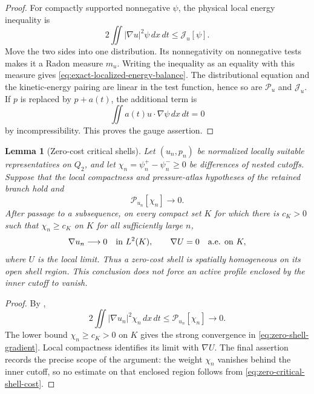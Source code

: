 \documentclass[11pt]{amsart}
\numberwithin{equation}{section}
\theoremstyle{plain}
\newtheorem{lemma}[lemma]{Lemma}
\theoremstyle{definition}
\theoremstyle{remark}
\begin{document}
\begin{proof}
For compactly supported nonnegative \(\psi\), the physical local energy
inequality is
\[
 2\iint|\nabla u|^2\psi\,dx\,dt
 \le \mathscr J_u[\psi].
\]
Move the two sides into one distribution.  Its nonnegativity on nonnegative
tests makes it a Radon measure \(m_u\).  Writing the inequality as an equality
with this measure gives
\eqref{eq:exact-localized-energy-balance}.  The distributional equation and
the kinetic-energy pairing are linear in the test function, hence so are
\(\mathscr P_u\) and \(\mathscr J_u\).  If \(p\) is replaced by
\(p+a(t)\), the additional term is
\[
 \iint a(t)u\cdot\nabla\psi\,dx\,dt=0
\]
by incompressibility.  This proves the gauge assertion.
\end{proof}

\begin{lemma}[Zero-cost critical shells]
\label{lem:critical-shell-zero-cost-limit}
Let \((u_n,p_n)\) be normalized locally suitable representatives on
\(Q_2\), and let \(\chi_n=\psi_n^+-\psi_n^-\ge0\) be differences of nested
cutoffs.  Suppose that the local compactness and pressure-atlas hypotheses of
the retained branch hold and
\begin{equation}\label{eq:zero-critical-shell-cost}
 \mathscr P_{u_n}[\chi_n]\longrightarrow0.
\end{equation}
After passage to a subsequence, on every compact set \(K\) for which there is
\(c_K>0\) such that \(\chi_n\ge c_K\) on \(K\) for all sufficiently large
\(n\),
\begin{equation}\label{eq:zero-shell-gradient}
 \nabla u_n\longrightarrow0\quad\hbox{in }L^2(K),
 \qquad \nabla U=0\quad\hbox{a.e. on }K,
\end{equation}
where \(U\) is the local limit.  Thus a zero-cost shell is spatially
homogeneous on its open shell region.  This conclusion does not force an
active profile enclosed by the inner cutoff to vanish.
\end{lemma}

\begin{proof}
By ,
\[
 2\iint |\nabla u_n|^2\chi_n\,dx\,dt
 \le \mathscr P_{u_n}[\chi_n]\longrightarrow0.
\]
The lower bound \(\chi_n\ge c_K>0\) on \(K\) gives
the strong convergence in \eqref{eq:zero-shell-gradient}.  Local compactness
identifies its limit with \(\nabla U\).  The final assertion records the
precise scope of the argument: the weight \(\chi_n\) vanishes behind the inner
cutoff, so no estimate on that enclosed region follows from
\eqref{eq:zero-critical-shell-cost}.
\end{proof}
\end{document}
